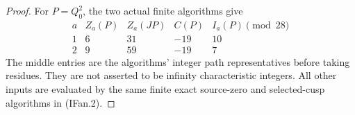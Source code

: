 \begin{proof}
For \(P=Q_0^2\), the two actual finite algorithms give
\[
 \begin{array}{c|rrr|r}
 a&Z_a(P)&Z_a(JP)&C(P)&I_a(P)\pmod{28}\\\hline
 1&6&31&-19&10\\
 2&9&59&-19&7
 \end{array}
\]
The middle entries are the algorithms' integer path representatives
before taking residues. They are not asserted to be infinity
characteristic integers. All other inputs are evaluated by the same
finite exact source-zero and selected-cusp algorithms in (IFan.2).
\end{proof}